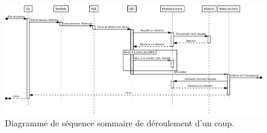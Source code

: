\begin{figure}[p]
\centering
\includegraphics[width=0.9\textheight,angle=90]{files/analyse/sequence}
\caption{Diagramme de séquence sommaire de déroulement d'un coup.}
\label{diag_sequence_coup}
\end{figure}
